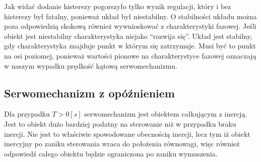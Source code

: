 \documentclass[12pt]{article}
\begin{document}
Jak widać dodanie histerezy pogorszyło tylko wynik regulacji, który i bez
histerezy był fatalny, ponieważ układ był niestabilny. O stabilności układu
można poza odpowiedzią skokową również wywnioskować z charakterystyki fazowej.
Jeśli obiekt jest niestabilny charakterystyka niejako ``rozwija się''. Układ
jest stabilny, gdy charakterystyka znajduje punkt w którym się zatrzymuje. Musi
być to punkt na osi poziomej, ponieważ wartości pionowe na charakterystyce
fazowej oznaczają w naszym wypadku prędkość kątową serwomechanizmu.

\subsection{Serwomechanizm z opóźnieniem}

Dla przypadku $T>0[s]$ serwomechanizm jest obiektem całkującym z inercją.
Jest to obiekt dużo bardziej podatny na sterowanie niż w przypadku braku 
inercji. Nie jest to właściwie spowodowane obecnością inercji, lecz tym iż
obiekt inercyjny po zaniku sterowania wraca do położenia równowagi, więc również
odpowiedź całego obiektu będzie ograniczona po zaniku wymuszenia.
\end{document}

